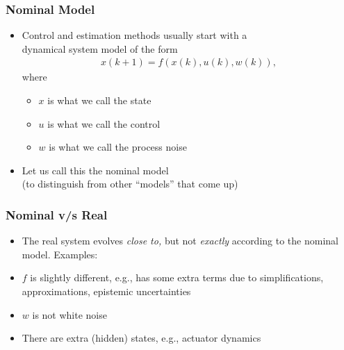 \documentclass[aspectratio=169,handout]{beamer} 	%
\begin{document}
\begin{frame}
	\frametitle{Nominal Model}
	\begin{itemize}[<+->]
		\itemsep\baselineskip
		\item Control and estimation methods usually start with a \\ dynamical system 
		model of the form
		\begin{align*}
			x(k + 1) = f( x(k), u(k), w(k) ),
		\end{align*}
		where%
		\begin{itemize}
			\item $x$ is what we call the {state}
			\item $u$ is what we call the {control}
			\item $w$ is what we call the {process noise}
		\end{itemize}
		
		\item Let us call this the \alert{nominal model} \\
		(to distinguish from other ``models'' that come up)
		
	\end{itemize}
	
\end{frame}



\begin{frame}
	\frametitle{Nominal v/s Real}
	\begin{itemize}[<+->]
		\itemsep\baselineskip
		\item The real system evolves \emph{close to,} 
		but not \emph{exactly} according to the nominal model. Examples:
		
		\item $f$ is slightly different, e.g., has some extra terms 
		due to simplifications, approximations, epistemic uncertainties
		
		\item $w$ is not white noise
		
		\item There are extra (hidden) states, e.g., actuator dynamics
		
		
	\end{itemize}
	
\end{frame}
\end{document}
